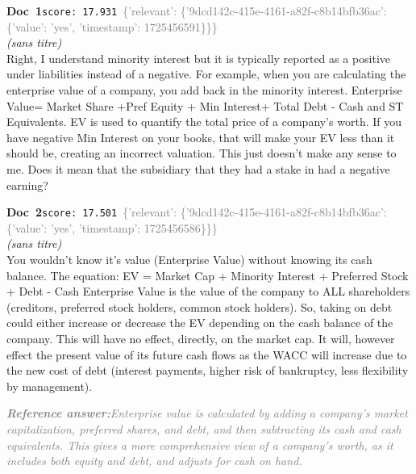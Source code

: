 \documentclass[a4paper,11pt]{article}
\begin{document}
\begin{docenv}
{\footnotesize\textcolor{doccolor}{\textbf{Doc~1}}}\hfill{\tiny\texttt{score:~17.931}}\ {\tiny\textcolor{gray}{\{'relevant': \{'9dcd142c-415e-4161-a82f-c8b14bfb36ac': \{'value': 'yes', 'timestamp': 1725456591\}\}\}}}\\[3pt]
{\small\textit{(sans titre)}}\\[2pt]
\vspace{2pt}
{\footnotesize 
Right, I understand minority interest but it is typically reported as a positive under liabilities instead of a negative. For example, when you are calculating the enterprise value of a company, you add back in the minority interest.    Enterprise Value= Market Share +Pref Equity + Min Interest+ Total Debt - Cash and ST Equivalents.    EV is used to quantify the total price of a company's worth. If you have negative Min Interest on your books, that will make your EV less than it should be, creating an incorrect valuation.   This just doesn't make any sense to me. Does it mean that the subsidiary that they had a stake in had a negative earning?}
\end{docenv}
\begin{docenv}
{\footnotesize\textcolor{doccolor}{\textbf{Doc~2}}}\hfill{\tiny\texttt{score:~17.501}}\ {\tiny\textcolor{gray}{\{'relevant': \{'9dcd142c-415e-4161-a82f-c8b14bfb36ac': \{'value': 'yes', 'timestamp': 1725456586\}\}\}}}\\[3pt]
{\small\textit{(sans titre)}}\\[2pt]
\vspace{2pt}
{\footnotesize 
You wouldn't know it's value (Enterprise Value) without knowing its cash balance.  The equation:   EV = Market Cap + Minority Interest + Preferred Stock + Debt - Cash  Enterprise Value is the value of the company to ALL shareholders (creditors, preferred stock holders, common stock holders).  So, taking on debt could either increase or decrease the EV depending on the cash balance of the company.  This will have no effect, directly, on the market cap. It will, however effect the present value of its future cash flows as the WACC will increase due to the new cost of debt (interest payments, higher risk of bankruptcy, less flexibility by management).}
\end{docenv}
\begin{refanswerenv}
{\footnotesize\textit{\textcolor{gray}{\textbf{Reference answer:}\enspace Enterprise value is calculated by adding a company's market capitalization, preferred shares, and debt, and then subtracting its cash and cash equivalents. This gives a more comprehensive view of a company's worth, as it includes both equity and debt, and adjusts for cash on hand.}}}
\end{refanswerenv}
\end{document}
